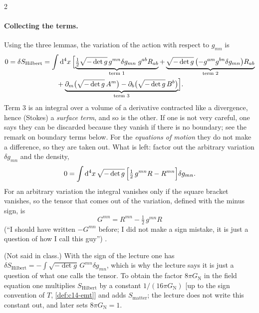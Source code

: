 \begin{paracol}{2}
\paragraph{Collecting the terms.} Using the three lemmas, the variation of the action with respect to $g_{mn}$ is
\[
\begin{aligned}
  0=\delta S_{\mathrm{Hilbert}}&=\int\mathrm d^4x\,\Bigl[\underbrace{\tfrac12\sqrt{-\det g}\,g^{mn}\delta g_{mn}\;g^{ab}R_{ab}}_{\text{term 1}}
  +\underbrace{\sqrt{-\det g}\,\bigl(-g^{am}g^{bn}\delta g_{mn}\bigr)R_{ab}}_{\text{term 2}}\\
  &\qquad+\underbrace{\partial_m\bigl(\sqrt{-\det g}\,A^m\bigr)-\partial_b\bigl(\sqrt{-\det g}\,B^b\bigr)}_{\text{term 3}}\Bigr].
\end{aligned}
\]
Term 3 is an integral over a volume of a derivative contracted like a divergence, hence (Stokes) a \emph{surface term}, and so is the other. If one is not very careful, one says they can be discarded because they vanish if there is no boundary; see the remark on boundary terms below. For the \emph{equations of motion} they do not make a difference, so they are taken out. What is left: factor out the arbitrary variation $\delta g_{mn}$ and the density,
\[
  0=\int\mathrm d^4x\,\sqrt{-\det g}\,\Bigl[\tfrac12\,g^{mn}R-R^{mn}\Bigr]\delta g_{mn}.
\]
For an arbitrary variation the integral vanishes only if the square bracket vanishes, so the tensor that comes out of the variation, defined with the minus sign, is
\begin{equation}\label{eq:c15-einsteintensor}
  G^{mn}=R^{mn}-\tfrac12\,g^{mn}R
\end{equation}
(``I should have written $-G^{mn}$ before; I did not make a sign mistake, it is just a question of how I call this guy'') .
\begin{coursenote}
(Not said in class.) With the sign of the lecture one has $\delta S_{\mathrm{Hilbert}}=-\int\sqrt{-\det g}\,G^{mn}\delta g_{mn}$, which is why the lecture says it is just a question of what one calls the tensor. To obtain the factor $8\pi G_{\mathrm N}$ in the field equation one multiplies $S_{\mathrm{Hilbert}}$ by a constant $1/(16\pi G_{\mathrm N})$ [up to the sign convention of $T$, \cref{def:c14-emt}] and adds $S_{\mathrm{matter}}$; the lecture does not write this constant out, and later sets $8\pi G_{\mathrm N}=1$.
\end{coursenote}


\end{paracol}
